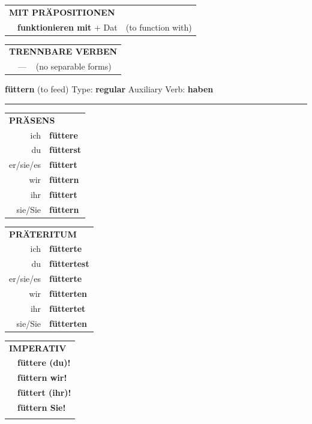 \documentclass[10pt,a4paper]{revtex4-2}
\begin{document}
\begin{verbbox}
\vspace{10pt}

\begin{tabular}{lll}
\multicolumn{3}{l}{\textbf{MIT PRÄPOSITIONEN}}\\
& \textbf{funktionieren mit} + Dat & (to function with)\\
\end{tabular}
\hfill
\begin{tabular}{lll}
\multicolumn{3}{l}{\textbf{TRENNBARE VERBEN}}\\
& --- & (no separable forms)\\
\end{tabular}
\vspace{-5pt}
\end{verbbox}

\begin{verbbox}
    {\Large \bf füttern} (to feed) \hfill Type: \textbf{regular} \hfill Auxiliary Verb: \textbf{haben} 
    
     \vspace{5pt}

    \hrule
    
    \vspace{5pt}

  \begin{tabular}{rl}
     \multicolumn{2}{l}{\textbf{PRÄSENS} }\\
    ich & \textbf{füttere}\\
    du & \textbf{fütterst}\\
    er/sie/es & \textbf{füttert}\\
    wir & \textbf{füttern}\\
    ihr & \textbf{füttert}\\
    sie/Sie & \textbf{füttern}\\
  \end{tabular}
  \hfill
     \begin{tabular}{rl}
    \multicolumn{2}{l}{\textbf{PRÄTERITUM} }\\
    ich & \textbf{fütterte}\\
    du & \textbf{füttertest}\\
    er/sie/es & \textbf{fütterte}\\
    wir & \textbf{fütterten}\\
    ihr & \textbf{füttertet}\\
    sie/Sie & \textbf{fütterten}\\
  \end{tabular}
  \hfill
  \begin{tabular}{rl}
     \multicolumn{2}{l}{\textbf{IMPERATIV} }\\
   & \textbf{füttere (du)!}\\
   & \textbf{füttern wir!}\\
   & \textbf{füttert (ihr)!}\\
   & \textbf{füttern Sie!}\\
   & \vspace{10pt}
  \end{tabular}


\end{verbbox}
\end{document}
